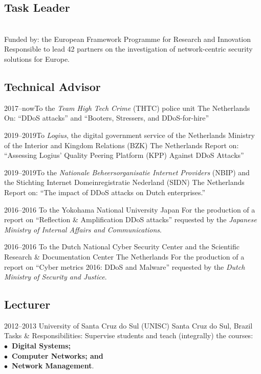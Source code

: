 \documentclass[print]{styles/friggeri-cv-linux} %
\begin{document}
\subsection{Task Leader}\vspace{-5pt}
\begin{entrylist}
{\\Funded by: the European Framework Programme for Research and Innovation}
{Responsible to lead 42 partners on the investigation of network-centric security solutions for Europe.}%
\end{entrylist}
\subsection{Technical Advisor}\vspace{-5pt}
\begin{entrylist}

\entry
{2017--now}{To the \textit{Team High Tech Crime} (THTC) police unit}
{The Netherlands}
{On: ``DDoS attacks'' and ``Booters, Stressers, and DDoS-for-hire''}

\entry
{2019--2019}{To \textit{Logius}, the digital government service of the Netherlands Ministry of the Interior and Kingdom Relations (BZK)}
{The Netherlands}
{Report on: ``Assessing Logius' Quality Peering Platform (KPP) Against DDoS Attacks''}

\entry
{2019--2019}{To the \textit{Nationale Beheersorganisatie Internet Providers} (NBIP) and the Stichting Internet Domeinregistratie Nederland (SIDN)}
{The Netherlands}
{Report on: ``The impact of DDoS attacks on Dutch enterprises.''}
	
\entry
{2016--2016}
{To the Yokohama National University}
{Japan}
{For the production of a report on ``Reflection \& Amplification DDoS attacks''
requested by the \emph{Japanese Ministry of Internal Affairs and
Communications}.}

\entry
{2016--2016}
{To the Dutch National Cyber Security Center and the Scientific Research \& Documentation Center}
{The Netherlands}
{For the production of a report on ``Cyber metrics 2016: DDoS and Malware'' requested by the \emph{Dutch Ministry of Security and Justice}.} 

\end{entrylist}



\subsection{Lecturer}\vspace{-5pt}
\begin{entrylist}
\entry
{2012--2013}
{University of Santa Cruz do Sul (UNISC)}
{Santa Cruz do Sul, Brazil}
{Tasks \& Responsibilities: Supervise students and teach (integrally) the courses: \\
	\textbf{$\bullet$~Digital Systems;\\$\bullet$~Computer Networks; and\\$\bullet$~Network Management}.} 
\end{entrylist}
\end{document}

